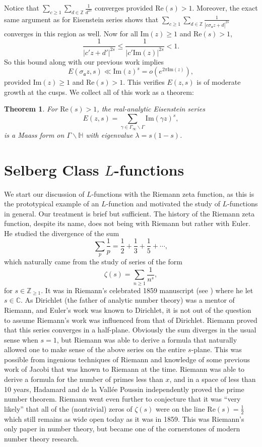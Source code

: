 \documentclass[12pt]{book}
\newtheorem{theorem}{Theorem}[section]
\theoremstyle{definition}\newframedtheorem{method}{Method}
\newcommand{\mf}{\mathfrak}
\newcommand{\Z}{\mathbb{Z}}
\newcommand{\C}{\mathbb{C}}
\renewcommand{\H}{\mathbb{H}}
\newcommand{\g}{\gamma}
\newcommand{\z}{\zeta}
\renewcommand{\l}{\lambda}
\newcommand{\s}{\sigma}
\newcommand{\G}{\Gamma}
\newcommand{\<}{\langle}
\renewcommand{\>}{\rangle}
\renewcommand{\Re}{\mathrm{Re}}
\renewcommand{\Im}{\mathrm{Im}}
\newcommand{\GH}{\G\backslash\H}
\newcommand{\GG}{\G_{\infty}\backslash\G}
\begin{document}
      Notice that $\sum_{c \ge 1}\sum_{d \in \Z}\frac{1}{d^{2s}}$ converges provided $\Re(s) > 1$. Moreover, the exact same argument as for Eisenstein series shows that $\sum_{c \ge 1}\sum_{d \in \Z}\frac{1}{|c\s_{\mf{a}}z+d|^{2s}}$ converges in this region as well. Now for all $\Im(z) \ge 1$ and $\Re(s) > 1$,
      \[
        \frac{1}{|c'z+d'|^{2s}} \le \frac{1}{|c'\Im(z)|^{2s}} < 1.
      \]
      So this bound along with our previous work implies
      \[
        E(\s_{\mf{a}}z,s) \ll \Im(z)^{s} = o(e^{2\pi\Im(z)}),
      \]
      provided $\Im(z) \ge 1$ and $\Re(s) > 1$. This verifies $E(z,s)$ is of moderate growth at the cusps. We collect all of this work as a theorem:

      \begin{theorem}
        For $\Re(s) > 1$, the real-analytic Eisenstein series
        \[
          E(z,s) = \sum_{\g \in \GG}\Im(\g z)^{s},
        \]
        is a Maass form on $\GH$ with eigenvalue $\l = s(1-s)$.
      \end{theorem}
\chapter{Selberg Class \texorpdfstring{$L$}{L}-functions}\label{cha:Standard_Class_L-functions}
  We start our discussion of $L$-functions with the Riemann zeta function, as this is the prototypical example of an $L$-function and motivated the study of $L$-functions in general. Our treatment is brief but sufficient. The history of the Riemann zeta function, despite its name, does not being with Riemann but rather with Euler. He studied the divergence of the sum
  \[
    \sum_{p}\frac{1}{p} = \frac{1}{2}+\frac{1}{3}+\frac{1}{5}+\cdots,
  \]
  which naturally came from the study of series of the form
  \[
    \z(s) = \sum_{n \ge 1}\frac{1}{n^{s}},
  \]
  for $s \in \Z_{\ge 1}$. It was in Riemann's celebrated 1859 manuscript (see \cite{riemann1859ueber}) where he let $s \in \C$. As Dirichlet (the father of analytic number theory) was a mentor of Riemann, and Euler's work was known to Dirichlet, it is not out of the question to assume Riemann's work was influenced from that of Dirichlet. Riemann proved that this series converges in a half-plane. Obviously the sum diverges in the usual sense when $s = 1$, but Riemann was able to derive a formula that naturally allowed one to make sense of the above series on the entire $s$-plane. This was possible from ingenious techniques of Riemann and knowledge of some previous work of Jacobi that was known to Riemann at the time. Riemann was able to derive a formula for the number of primes less than $x$, and in a space of less than 10 years, Hadamard and de la Vall\'ee Poussin independently proved the prime number theorem. Riemann went even further to conjecture that it was ``very likely'' that all of the (nontrivial) zeros of $\z(s)$ were on the line $\Re(s) = \frac{1}{2}$ which still remains as wide open today as it was in 1859. This was Riemann's only paper in number theory, but became one of the cornerstones of modern number theory research.
\end{document}
